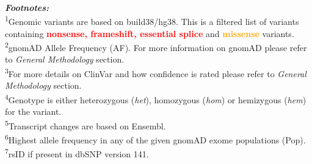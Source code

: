 \\ \\ \\
\textbf{\textit{Footnotes:}}
\\
\textsuperscript{1}Genomic variants are based on build38/hg38. This is a filtered list of variants containing \textcolor{red}{\textbf{nonsense, frameshift, essential splice}} and \textcolor{Orange}{\textbf{missense}} variants.
\\
\textsuperscript{2}gnomAD Allele Frequency (AF). For more information on gnomAD please refer to \textit{General Methodology} section.
\\
\textsuperscript{3}For more details on ClinVar and how confidence is rated please refer to \textit{General Methodology} section.
\\
\textsuperscript{4}Genotype is either heterozygous (\textit{het}), homozygous (\textit{hom}) or hemizygous (\textit{hem}) for the variant.
\\
\textsuperscript{5}Transcript changes are based on Ensembl.
\\
\textsuperscript{6}Highest allele frequency in any of the given gnomAD exome populations (Pop).
\\
\textsuperscript{7}rsID if present in dbSNP version 141.
\\
\newpage
